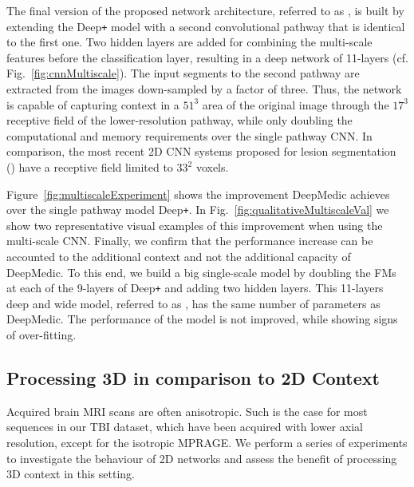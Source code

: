 The final version of the proposed network architecture, referred to as , is built by extending the Deep\texttt{+} model with a second convolutional pathway that is identical to the first one. Two hidden layers are added for combining the multi-scale features before the classification layer, resulting in a deep network of 11-layers (cf. Fig.~\ref{fig:cnnMultiscale}). The input segments to the second pathway are extracted from the images down-sampled by a factor of three. Thus, the network is capable of capturing context in a $51^3$ area of the original image through the $17^3$ receptive field of the lower-resolution pathway, while only doubling the computational and memory requirements over the single pathway CNN. In comparison, the most recent 2D CNN systems proposed for lesion segmentation (\cite{Havei2015Journal, pereira2015Brats}) have a receptive field limited to $33^2$ voxels.



Figure~\ref{fig:multiscaleExperiment} shows the improvement DeepMedic achieves over the single pathway model Deep\texttt{+}. In Fig.~\ref{fig:qualitativeMultiscaleVal} we show two representative visual examples of this improvement when using the multi-scale CNN. Finally, we confirm that the performance increase can be accounted to the additional context and not the additional capacity of DeepMedic. To this end, we build a big single-scale model by doubling the FMs at each of the 9-layers of Deep\texttt{+} and adding two hidden layers. This 11-layers deep and wide model, referred to as , has the same number of parameters as DeepMedic. The performance of the model is not improved, while showing signs of over-fitting.

\subsection{Processing 3D in comparison to 2D Context}
\label{subsec:val3dContext}

Acquired brain MRI scans are often anisotropic. Such is the case for most sequences in our TBI dataset, which have been acquired with lower axial resolution, except for the isotropic MPRAGE. We perform a series of experiments to investigate the behaviour of 2D networks and assess the benefit of processing 3D context in this setting.

